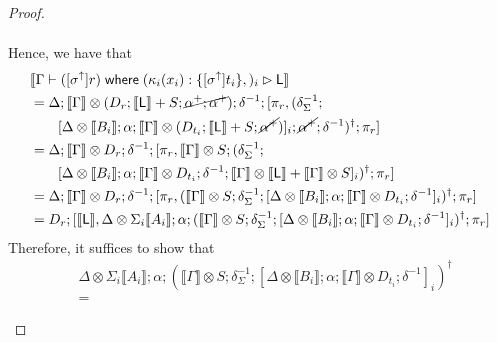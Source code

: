 \documentclass[acmsmall,screen,review]{acmart}
\newcommand{\ms}[1]{\ensuremath{\mathsf{#1}}}
\newcommand{\lto}{:}
\newcommand{\where}[2]{#1\;\ms{where}\;#2}
\newcommand{\wbranch}[3]{#1(#2) \lto \{#3\}}
\newcommand{\upg}[1]{{#1}^\uparrow}
\newcommand{\haslb}[3]{#1 \vdash #2 \rhd #3}
\newcommand{\dnt}[1]{\llbracket{#1}\rrbracket}
\begin{document}
\begin{proof}
\begin{itemize}
\begin{equation}
\begin{aligned}
      \end{aligned}
    \end{equation}
    Hence, we have that
    \begin{equation}
      \begin{aligned}
        & \dnt{\haslb{\Gamma}
        {\where{([\upg{\sigma}]r)}{(\wbranch{\kappa_i}{x_i}{[\upg{\sigma}]t_i},)_i}}
        {\ms{L}}} \\
        &= \Delta ; \dnt{\Gamma} \otimes (D_r ; \dnt{\ms{L}} + S ; \cancel{\alpha^+ ; \alpha^+})
        ; \delta^{-1} ; [\pi_r, (
          \delta^{-1}_\Sigma ; \\ &\qquad [
            \Delta \otimes \dnt{B_i} ; \alpha ; \dnt{\Gamma} \otimes (D_{t_i} ; \dnt{\ms{L}} + S ; 
              \cancel{\alpha^+}) 
          ]_i ; \cancel{\alpha^+} ; \delta^{-1}
        )^{\dagger}; \pi_r] \\
        &= \Delta ; \dnt{\Gamma} \otimes D_r ; \delta^{-1} 
                  ; [\pi_r, \dnt{\Gamma} \otimes S ; (\delta^{-1}_{\Sigma}; 
                  \\ &\qquad [
            \Delta \otimes \dnt{B_i} ; \alpha ; \dnt{\Gamma} \otimes D_{t_i} ; \delta^{-1} ; 
            \dnt{\Gamma} \otimes \dnt{\ms{L}} + \dnt{\Gamma} \otimes S
          ]_i
        )^{\dagger}; \pi_r] \\
        &= \Delta ; \dnt{\Gamma} \otimes D_r ; \delta^{-1} 
                  ; [\pi_r, (\dnt{\Gamma} \otimes S ; \delta^{-1}_{\Sigma}; 
                  [
            \Delta \otimes \dnt{B_i} ; \alpha ; \dnt{\Gamma} \otimes D_{t_i} ; \delta^{-1}
          ]_i
        )^{\dagger}; \pi_r] \\
        &= D_r ; [\dnt{\ms{L}}, 
          \Delta \otimes \Sigma_i \dnt{A_i} 
            ; \alpha ; (\dnt{\Gamma} \otimes S ; \delta^{-1}_{\Sigma}; 
                  [
            \Delta \otimes \dnt{B_i} ; \alpha ; \dnt{\Gamma} \otimes D_{t_i} ; \delta^{-1}
          ]_i
        )^{\dagger}; \pi_r]
      \end{aligned}
    \end{equation}
    Therefore, it suffices to show that
    \begin{equation}
      \begin{aligned}
        & \Delta \otimes \Sigma_i \dnt{A_i} 
            ; \alpha ; (\dnt{\Gamma} \otimes S ; \delta^{-1}_{\Sigma}; 
                  [
            \Delta \otimes \dnt{B_i} ; \alpha ; \dnt{\Gamma} \otimes D_{t_i} ; \delta^{-1}
          ]_i
        )^{\dagger} \\
        &= 

\end{aligned}
\end{equation}
\end{itemize}
\end{proof}
\end{document}

